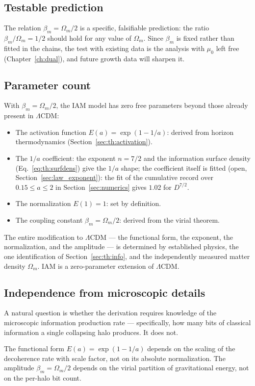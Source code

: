 \subsection{Testable prediction}
The relation $\beta_m=\Omega_m/2$ is a specific, falsifiable prediction: the ratio $\beta_m/\Omega_m=1/2$ should hold for any value of $\Omega_m$. Since
$\beta_m$ is fixed rather than fitted in the chains, the test with existing data is the analysis with $\mu_0$ left free (Chapter~\ref{ch:dual}), and future growth
data will sharpen it. \prediction

\subsection{Parameter count}
With $\beta_m=\Omega_m/2$, the IAM model has zero free parameters beyond those already present in $\Lambda$CDM:
\begin{itemize}
\item The activation function $E(a)=\exp(1-1/a)$: derived from horizon thermodynamics (Section~\ref{sec:th:activation}).
\item The $1/a$ coefficient: the exponent $n=7/2$ and the information surface density (Eq.~\eqref{eq:th:surfdens}) give the $1/a$ shape; the coefficient itself is fitted (open, Section~\ref{sec:law_exponent}): the fit of the cumulative record over $0.15\le a\le2$ in
Section~\ref{sec:numerics} gives $1.02$ for $D^{7/2}$.
\item The normalization $E(1)=1$: set by definition.
\item The coupling constant $\beta_m=\Omega_m/2$: derived from the virial theorem.
\end{itemize}
The entire modification to $\Lambda$CDM --- the functional form, the exponent, the normalization, and the amplitude --- is determined by established
physics, the one identification of Section~\ref{sec:th:info}, and the independently measured matter density $\Omega_m$. IAM is a zero-parameter extension of
$\Lambda$CDM.

\subsection{Independence from microscopic details}
A natural question is whether the derivation requires knowledge of the microscopic information production rate --- specifically, how many bits of
classical information a single collapsing halo produces. It does not. \interp

The functional form $E(a)=\exp(1-1/a)$ depends on the scaling of the decoherence rate with scale factor, not on its absolute normalization. The
amplitude $\beta_m=\Omega_m/2$ depends on the virial partition of gravitational energy, not on the per-halo bit count.

